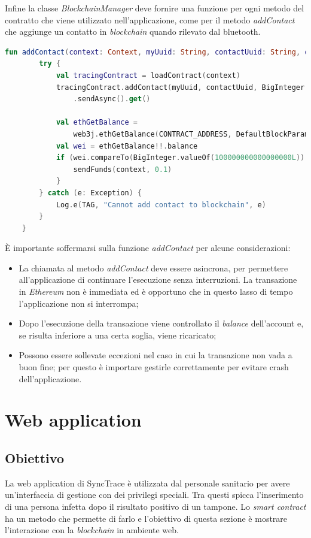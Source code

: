 \newpage
Infine la classe \textit{BlockchainManager} deve fornire una funzione per ogni metodo del contratto che viene utilizzato nell'applicazione, come per il metodo \textit{addContact} che aggiunge un contatto in \textit{blockchain} quando rilevato dal bluetooth.

\mbox{\\}
\begin{lstlisting}[language = Kotlin]
    fun addContact(context: Context, myUuid: String, contactUuid: String, contactIndex: Double) {
        try {
            val tracingContract = loadContract(context)
            tracingContract.addContact(myUuid, contactUuid, BigInteger.valueOf(contactIndex.toLong()))
                .sendAsync().get()

            val ethGetBalance =
                web3j.ethGetBalance(CONTRACT_ADDRESS, DefaultBlockParameterName.LATEST).sendAsync().get()
            val wei = ethGetBalance!!.balance
            if (wei.compareTo(BigInteger.valueOf(100000000000000000L)) == -1) {
                sendFunds(context, 0.1)
            }
        } catch (e: Exception) {
            Log.e(TAG, "Cannot add contact to blockchain", e)
        }
    }
\end{lstlisting}
\mbox{\\}

È importante soffermarsi sulla funzione \textit{addContact} per alcune considerazioni:
\begin{itemize}
	\item{La chiamata al metodo \textit{addContact} deve essere asincrona, per permettere all'applicazione di continuare l'esecuzione senza interruzioni. La transazione in \textit{Ethereum} non è immediata ed è opportuno che in questo lasso di tempo l'applicazione non si interrompa;}
	\item{Dopo l'esecuzione della transazione viene controllato il \textit{balance} dell'account e, se risulta inferiore a una certa soglia, viene ricaricato;}
	\item{Possono essere sollevate eccezioni nel caso in cui la transazione non vada a buon fine; per questo è importare gestirle correttamente per evitare crash dell'applicazione.}
\end{itemize}


\section{Web application}
\subsection{Obiettivo}
La web application di SyncTrace è utilizzata dal personale sanitario per avere un'interfaccia di gestione con dei privilegi speciali. Tra questi spicca l'inserimento di una persona infetta dopo il risultato positivo di un tampone. Lo \textit{smart contract} ha un metodo che permette di farlo e l'obiettivo di questa sezione è mostrare l'interazione con la \textit{blockchain} in ambiente web.
\newpage
